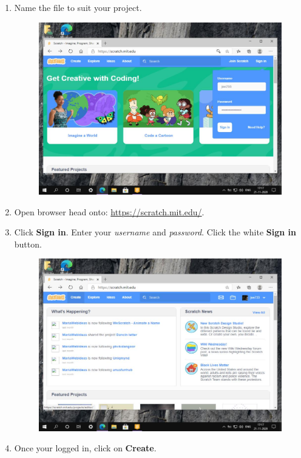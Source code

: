 \documentclass[a4paper]{article}
\begin{document}
\begin{enumerate}
    \item Name the file to suit your project.

          \begin{figure}[H]
              \centering
              \includegraphics[width = .8\linewidth]{12}
          \end{figure}

    \item Open browser head onto: \href{https://scratch.mit.edu/}{https://scratch.mit.edu/}.
    \item Click \textbf{Sign in}. Enter your \textit{username} and \textit{password}. Click the white \textbf{Sign in} button.

          \begin{figure}[H]
              \centering
              \includegraphics[width = .8\linewidth]{13}
          \end{figure}

    \item Once your logged in, click on \textbf{Create}.


\end{enumerate}
\end{document}
